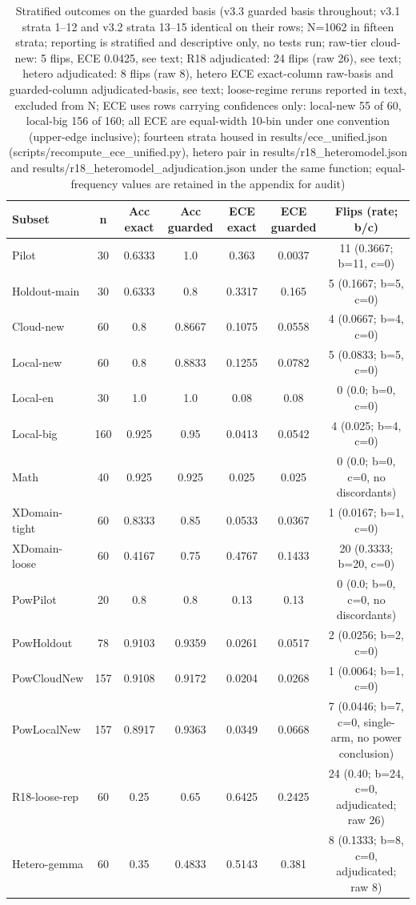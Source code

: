 \documentclass[10pt]{article} %
\begin{document}
\begin{table}[t]
\caption{Stratified outcomes on the guarded basis (v3.3 guarded basis throughout; v3.1 strata 1--12 and v3.2 strata 13--15 identical on their rows; N=1062 in fifteen strata; reporting is stratified and descriptive only, no tests run; raw-tier cloud-new: 5 flips, ECE 0.0425, see text; R18 adjudicated: 24 flips (raw 26), see text; hetero adjudicated: 8 flips (raw 8), hetero ECE exact-column raw-basis and guarded-column adjudicated-basis, see text; loose-regime reruns reported in text, excluded from N; ECE uses rows carrying confidences only: local-new 55 of 60, local-big 156 of 160; all ECE are equal-width 10-bin under one convention (upper-edge inclusive); fourteen strata housed in results/ece\_unified.json (scripts/recompute\_ece\_unified.py), hetero pair in results/r18\_heteromodel.json and results/r18\_heteromodel\_adjudication.json under the same function; equal-frequency values are retained in the appendix for audit)}
\label{tab:stratified}
\begin{center}
{\footnotesize\setlength{\tabcolsep}{3pt}
\begin{tabular}{lcccccc}
\hline
Subset & n & Acc exact & Acc guarded & ECE exact & ECE guarded & Flips (rate; b/c) \\
\hline
Pilot & 30 & 0.6333 & 1.0 & 0.363 & 0.0037 & 11 (0.3667; b=11, c=0) \\
Holdout-main & 30 & 0.6333 & 0.8 & 0.3317 & 0.165 & 5 (0.1667; b=5, c=0) \\
Cloud-new & 60 & 0.8 & 0.8667 & 0.1075 & 0.0558 & 4 (0.0667; b=4, c=0) \\
Local-new & 60 & 0.8 & 0.8833 & 0.1255 & 0.0782 & 5 (0.0833; b=5, c=0) \\
Local-en & 30 & 1.0 & 1.0 & 0.08 & 0.08 & 0 (0.0; b=0, c=0) \\
Local-big & 160 & 0.925 & 0.95 & 0.0413 & 0.0542 & 4 (0.025; b=4, c=0) \\
Math & 40 & 0.925 & 0.925 & 0.025 & 0.025 & 0 (0.0; b=0, c=0, no discordants) \\
XDomain-tight & 60 & 0.8333 & 0.85 & 0.0533 & 0.0367 & 1 (0.0167; b=1, c=0) \\
XDomain-loose & 60 & 0.4167 & 0.75 & 0.4767 & 0.1433 & 20 (0.3333; b=20, c=0) \\
PowPilot & 20 & 0.8 & 0.8 & 0.13 & 0.13 & 0 (0.0; b=0, c=0, no discordants) \\
PowHoldout & 78 & 0.9103 & 0.9359 & 0.0261 & 0.0517 & 2 (0.0256; b=2, c=0) \\
PowCloudNew & 157 & 0.9108 & 0.9172 & 0.0204 & 0.0268 & 1 (0.0064; b=1, c=0) \\
PowLocalNew & 157 & 0.8917 & 0.9363 & 0.0349 & 0.0668 & 7 (0.0446; b=7, c=0, single-arm, no power conclusion) \\
R18-loose-rep & 60 & 0.25 & 0.65 & 0.6425 & 0.2425 & 24 (0.40; b=24, c=0, adjudicated; raw 26) \\
Hetero-gemma & 60 & 0.35 & 0.4833 & 0.5143 & 0.381 & 8 (0.1333; b=8, c=0, adjudicated; raw 8) \\
\hline
\end{tabular}
}
\end{center}
\end{table}
\end{document}
